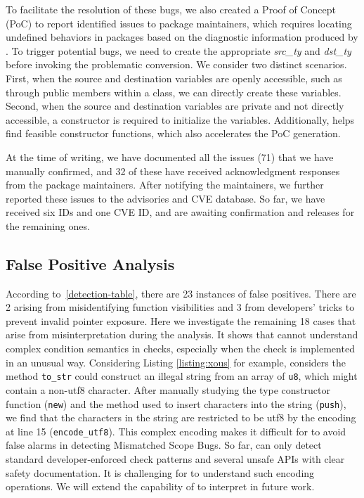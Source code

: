 \vspace{0.05in}
To facilitate the resolution of these bugs, we also created a Proof of Concept (PoC) to report identified issues to package maintainers, which requires locating undefined behaviors in packages based on the diagnostic information produced by \TN. To trigger potential bugs, we need to create the appropriate \textit{src\_ty} and \textit{dst\_ty} before invoking the problematic conversion. We consider two distinct scenarios. First, when the source and destination variables are openly accessible, such as through public members within a class, we can directly create these variables. Second, when the source and destination variables are private and not directly accessible, {a constructor is required to initialize the variables. Additionally, \TN helps find feasible constructor functions, which also accelerates the PoC generation}.






At the time of writing, we have documented all the issues ({71}) that we have manually confirmed, and {32} of these have received acknowledgment responses from the package maintainers. After notifying the maintainers, we further reported these issues to the \rs advisories and CVE database. So far, we have received {six \rs IDs and one CVE ID}, and are awaiting confirmation and releases for the remaining ones. 



\subsection{False Positive Analysis} \label{evaluation:fp}


According to~\autoref{detection-table}, there are {23} instances of false positives. There are 2 arising from misidentifying function visibilities and {3} from developers' tricks to prevent invalid pointer exposure. Here we investigate the remaining {18} cases that arise from misinterpretation during the \tc analysis. It shows that \TN cannot understand complex condition semantics in checks, especially when the check is implemented in an unusual way. Considering Listing \ref{listing:xous} for example, \TN considers the method \texttt{to\_str} could construct an illegal string from an array of \texttt{u8}, which might contain a non-utf8 character. After manually studying the type constructor function (\texttt{new}) and the method used to insert characters into the string (\texttt{push}), we find that the characters in the string are restricted to be utf8 by the encoding at line 15 (\texttt{encode\_utf8}). This complex encoding makes it difficult for \TN to avoid false alarms in detecting Mismatched Scope Bugs. So far, \TN can only detect standard developer-enforced check patterns and several unsafe APIs with clear safety documentation. It is challenging for \TN to understand such encoding operations. We will extend the capability of \TN to interpret \tc in future work.






